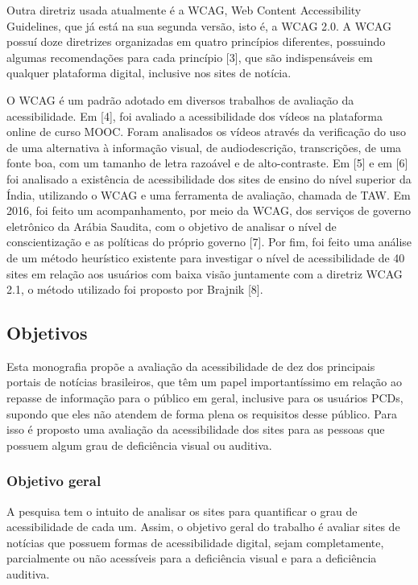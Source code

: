 \documentclass[a4paper]{article}
\begin{document}
\begin{titlepage}
Outra diretriz usada atualmente é a WCAG, Web Content Accessibility Guidelines, que já está na sua segunda versão, isto é, a WCAG 2.0. A WCAG possuí doze diretrizes organizadas em quatro princípios diferentes, possuindo algumas recomendações para cada princípio [3], que são indispensáveis em qualquer plataforma digital, inclusive nos sites de notícia.

O WCAG é um padrão adotado em diversos trabalhos de avaliação da acessibilidade. Em [4], foi avaliado a acessibilidade dos vídeos na plataforma online de curso MOOC. Foram analisados os vídeos através da verificação do uso de uma alternativa à informação visual, de audiodescrição, transcrições, de uma fonte boa, com um tamanho de letra razoável e de alto-contraste. Em [5] e em [6] foi analisado a existência de acessibilidade dos sites de ensino do nível superior da Índia, utilizando o WCAG e uma ferramenta de avaliação, chamada de TAW. Em 2016, foi feito um acompanhamento, por meio da WCAG, dos serviços de governo eletrônico da Arábia Saudita, com o objetivo de analisar o nível de conscientização e as políticas do próprio governo [7]. Por fim, foi feito uma análise de um método heurístico existente para investigar o nível de acessibilidade de 40 sites em relação aos usuários com baixa visão juntamente com a diretriz WCAG 2.1, o método utilizado foi proposto por Brajnik [8].

\subsection{Objetivos}

Esta monografia propõe a avaliação da acessibilidade de dez dos principais portais de notícias brasileiros, que têm um papel importantíssimo em relação ao repasse de informação para o público em geral, inclusive para os usuários PCDs, supondo que eles não atendem de forma plena os requisitos desse público. Para isso é proposto uma avaliação da acessibilidade dos sites para as pessoas que possuem algum grau de deficiência visual ou auditiva. 

\subsubsection{Objetivo geral}

A pesquisa tem o intuito de analisar os sites para quantificar o grau de acessibilidade de cada um. Assim, o objetivo geral do trabalho é avaliar sites de notícias que possuem formas de acessibilidade digital, sejam completamente, parcialmente ou não acessíveis para a deficiência visual e para a deficiência auditiva. 


\end{titlepage}
\end{document}
